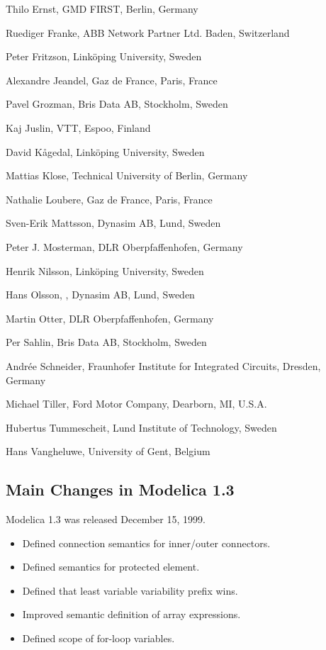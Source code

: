 \documentclass[10pt,a4paper]{report}
\def\doublelabel#1{\label{#1}}
\begin{document}
Thilo Ernst, GMD FIRST, Berlin, Germany

Ruediger Franke, ABB Network Partner Ltd. Baden, Switzerland

Peter Fritzson, Linköping University, Sweden

Alexandre Jeandel, Gaz de France, Paris, France

Pavel Grozman, Bris Data AB, Stockholm, Sweden

Kaj Juslin, VTT, Espoo, Finland

David Kågedal, Linköping University, Sweden

Mattias Klose, Technical University of Berlin, Germany

Nathalie Loubere, Gaz de France, Paris, France

Sven-Erik Mattsson, Dynasim AB, Lund, Sweden

Peter J. Mosterman, DLR Oberpfaffenhofen, Germany

Henrik Nilsson, Linköping University, Sweden

Hans Olsson, , Dynasim AB, Lund, Sweden

Martin Otter, DLR Oberpfaffenhofen, Germany

Per Sahlin, Bris Data AB, Stockholm, Sweden

Andrée Schneider, Fraunhofer Institute for Integrated Circuits, Dresden,
Germany

Michael Tiller, Ford Motor Company, Dearborn, MI, U.S.A.

Hubertus Tummescheit, Lund Institute of Technology, Sweden

Hans Vangheluwe, University of Gent, Belgium

\subsection{Main Changes in Modelica 1.3}\doublelabel{main-changes-in-modelica-1-3}

Modelica 1.3 was released December 15, 1999.

\begin{itemize}
\item
  Defined connection semantics for inner/outer connectors.
\item
  Defined semantics for protected element.
\item
  Defined that least variable variability prefix wins.
\item
  Improved semantic definition of array expressions.
\item
  Defined scope of for-loop variables.
\end{itemize}
\end{document}
